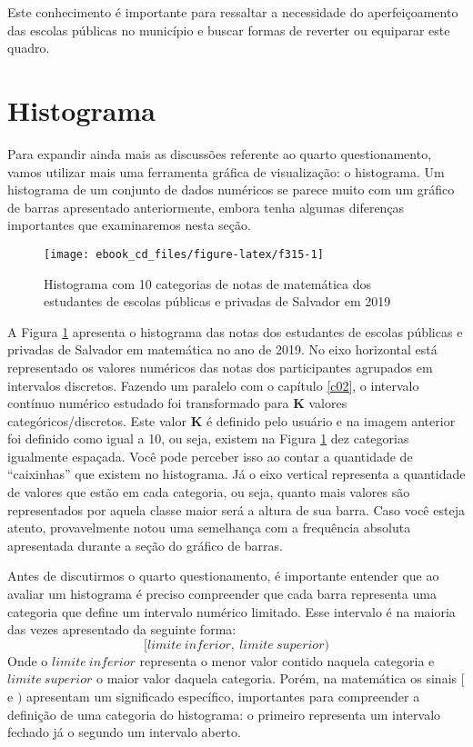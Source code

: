 \documentclass[
  oneside]{book}
\begin{document}
Este conhecimento é importante para ressaltar a necessidade do aperfeiçoamento das escolas públicas no município e buscar formas de reverter ou equiparar este quadro.

\hypertarget{ghist}{%
\section{Histograma}\label{ghist}}

Para expandir ainda mais as discussões referente ao quarto questionamento, vamos utilizar mais uma ferramenta gráfica de visualização: o histograma. Um histograma de um conjunto de dados numéricos se parece muito com um gráfico de barras apresentado anteriormente, embora tenha algumas diferenças importantes que examinaremos nesta seção.

\begin{figure}

{\centering \texttt{[image: ebook\_cd\_files/figure-latex/f315-1]} 

}

\caption{Histograma com 10 categorias de notas de matemática dos estudantes de escolas públicas e privadas de Salvador em 2019}\label{fig:f315}
\end{figure}

A Figura \ref{fig:f315} apresenta o histograma das notas dos estudantes de escolas públicas e privadas de Salvador em matemática no ano de 2019. No eixo horizontal está representado os valores numéricos das notas dos participantes agrupados em intervalos discretos. Fazendo um paralelo com o capítulo \ref{c02}, o intervalo contínuo numérico estudado foi transformado para \textbf{K} valores categóricos/discretos. Este valor \textbf{K} é definido pelo usuário e na imagem anterior foi definido como igual a 10, ou seja, existem na Figura \ref{fig:f315} dez categorias igualmente espaçada. Você pode perceber isso ao contar a quantidade de ``caixinhas'' que existem no histograma. Já o eixo vertical representa a quantidade de valores que estão em cada categoria, ou seja, quanto mais valores são representados por aquela classe maior será a altura de sua barra. Caso você esteja atento, provavelmente notou uma semelhança com a frequência absoluta apresentada durante a seção do gráfico de barras.

Antes de discutirmos o quarto questionamento, é importante entender que ao avaliar um histograma é preciso compreender que cada barra representa uma categoria que define um intervalo numérico limitado. Esse intervalo é na maioria das vezes apresentado da seguinte forma:
\[[limite\ inferior,\ limite\ superior)\]
Onde o \(limite\ inferior\) representa o menor valor contido naquela categoria e \(limite\ superior\) o maior valor daquela categoria. Porém, na matemática os sinais \([\) e \()\) apresentam um significado específico, importantes para compreender a definição de uma categoria do histograma: o primeiro representa um intervalo fechado já o segundo um intervalo aberto.
\end{document}
